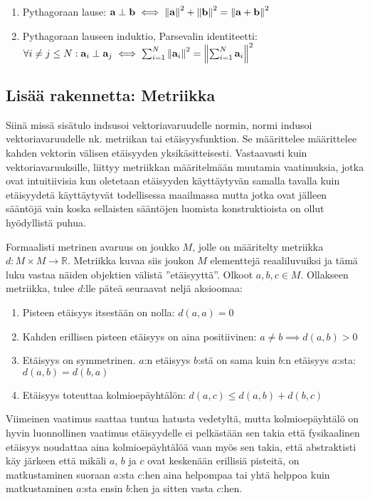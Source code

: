 \documentclass[../johdoksia.tex]{subfiles}
\begin{document}
	\begin{enumerate}
		\item Pythagoraan lause: $\mathbf{a} \perp \mathbf{b} \iff \norm{\mathbf{a}}^2 + \norm{\mathbf{b}}^2 = \norm{\mathbf{a} + \mathbf{b}}^2$
		\item Pythagoraan lauseen induktio, Parsevalin identiteetti: $\forall i \neq j \leq N: \mathbf{a}_i \perp \mathbf{a}_j \iff \sum_{i = 1}^{N}\norm{\mathbf{a}_i}^2 = \norm{\sum_{i = 1}^{N}\mathbf{a}_i}^2$
	\end{enumerate}
	
	\subsection{Lisää rakennetta: Metriikka}
	
	Siinä missä sisätulo indsusoi vektoriavaruudelle normin, normi indusoi vektoriavaruudelle nk. metriikan tai etäisyysfunktion. Se määrittelee määrittelee kahden vektorin välisen etäisyyden yksikäsitteisesti. Vastaavasti kuin vektoriavaruuksille, liittyy metriikkan määritelmään muutamia vaatimuksia, jotka ovat intuitiivisia kun oletetaan etäisyyden käyttäytyvän samalla tavalla kuin etäisyydetä käyttäytyvät todellisessa maailmassa mutta jotka ovat jälleen sääntöjä vain koska sellaisten sääntöjen luomista konstruktioista on ollut hyödyllistä puhua.
	
	Formaalisti metrinen avaruus on joukko $M$, jolle on määritelty metriikka $d : M \times M \to \mathbb{R}$. Metriikka kuvaa siis joukon $M$ elementtejä reaaliluvuiksi ja tämä luku vastaa näiden objektien välistä ''etäisyyttä''. Olkoot $a, b, c \in M$. Ollakseen metriikka, tulee $d$:lle päteä seuraavat neljä aksioomaa:
	
	\begin{enumerate}
		\item Pisteen etäisyys itsestään on nolla: $d(a, a) = 0$
		\item Kahden erillisen pisteen etäisyys on aina positiivinen: $a \neq b \implies d(a, b) > 0$
		\item Etäisyys on symmetrinen. $a$:n etäisyys $b$:stä on sama kuin $b$:n etäisyys $a$:sta: $d(a, b) = d(b, a)$
		\item Etäisyys toteuttaa kolmioepäyhtälön: $d(a, c) \leq d(a, b) + d(b, c)$
	\end{enumerate}
	
	Viimeinen vaatimus saattaa tuntua hatusta vedetyltä, mutta kolmioepäyhtälö on hyvin luonnollinen vaatimus etäisyydelle ei pelkästään sen takia että fysikaalinen etäisyys noudattaa aina kolmioepäyhtälöä vaan myös sen takia, että abstraktisti käy järkeen että mikäli $a$, $b$ ja $c$ ovat keskenään erillisiä pisteitä, on matkustaminen suoraan $a$:sta $c$:hen aina helpompaa tai yhtä helppoa kuin matkustaminen $a$:sta ensin $b$:hen ja sitten vasta $c$:hen.
	
\end{document}
